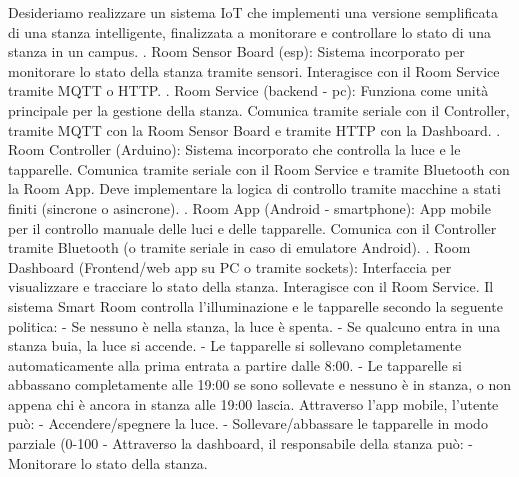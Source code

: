 \documentclass[12pt]{article}
\begin{document}
Desideriamo realizzare un sistema IoT che implementi una versione semplificata di una stanza intelligente, finalizzata a monitorare e controllare lo stato di una stanza in un campus. . Room Sensor Board (esp): Sistema incorporato per monitorare lo stato della stanza tramite sensori. Interagisce con il Room Service tramite MQTT o HTTP. . Room Service (backend - pc): Funziona come unità principale per la gestione della stanza. Comunica tramite seriale con il Controller, tramite MQTT con la Room Sensor Board e tramite HTTP con la Dashboard. . Room Controller (Arduino): Sistema incorporato che controlla la luce e le tapparelle. Comunica tramite seriale con il Room Service e tramite Bluetooth con la Room App. Deve implementare la logica di controllo tramite macchine a stati finiti (sincrone o asincrone). . Room App (Android - smartphone): App mobile per il controllo manuale delle luci e delle tapparelle. Comunica con il Controller tramite Bluetooth (o tramite seriale in caso di emulatore Android). . Room Dashboard (Frontend/web app su PC o tramite sockets): Interfaccia per visualizzare e tracciare lo stato della stanza. Interagisce con il Room Service. \newline
Il sistema Smart Room controlla l'illuminazione e le tapparelle secondo la seguente politica: \newline
- Se nessuno è nella stanza, la luce è spenta. \newline
- Se qualcuno entra in una stanza buia, la luce si accende. \newline
- Le tapparelle si sollevano completamente automaticamente alla prima entrata a partire dalle 8:00. \newline
- Le tapparelle si abbassano completamente alle 19:00 se sono sollevate e nessuno è in stanza, o non appena chi è ancora in stanza alle 19:00 lascia. \newline
Attraverso l'app mobile, l'utente può: \newline
- Accendere/spegnere la luce. \newline
- Sollevare/abbassare le tapparelle in modo parziale (0-100%
- Attraverso la dashboard, il responsabile della stanza può: \newline
- Monitorare lo stato della stanza. \newline
\end{document}
